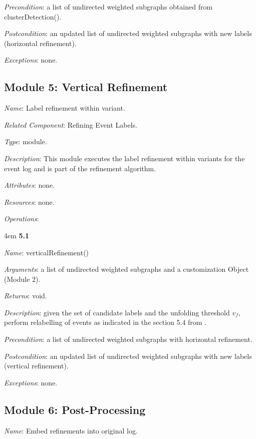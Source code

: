 \documentclass[notitlepage]{article}
\begin{document}
\begin{flushleft}
\textit{Precondition}: a list of undirected weighted subgraphs obtained from clusterDetection().

\textit{Postcondition}: an updated list of undirected weighted subgraphs with new labels (horizontal refinement).

\textit{Exceptions}: none.
\par
\endgroup

\subsection{Module 5: Vertical Refinement}
\textit{Name}: Label refinement within variant.

\textit{Related Component}: Refining Event Labels.

\textit{Type}: module.

\textit{Description}: This module executes the label refinement within variants for the event log and is part of the refinement algorithm.

\textit{Attributes}: none.

\textit{Resources}: none.

\textit{Operations}: 
\medskip

\par
\begingroup
\leftskip4em
\textbf{5.1} 

\textit{Name}: verticalRefinement()

\textit{Arguments}: a list of undirected weighted subgraphs and a customization Object (Module 2).

\textit{Returns}: void.

\textit{Description}: given the set of candidate labels and the unfolding threshold $v_f$, perform relabelling of events as indicated in the section 5.4 from \cite{paper}.

\textit{Precondition}: a list of undirected weighted subgraphs with horizontal refinement.

\textit{Postcondition}: an updated list of undirected weighted subgraphs with new labels (vertical refinement).

\textit{Exceptions}: none.
\par
\endgroup




\subsection{Module 6: Post-Processing}
\textit{Name}: Embed refinements into original log.


\end{flushleft}
\end{document}
